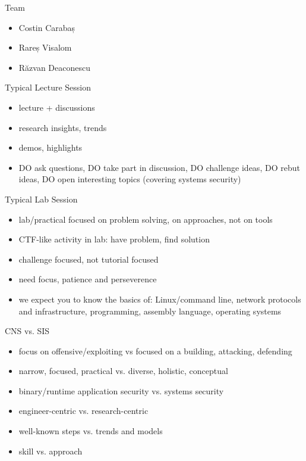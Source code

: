 \documentclass{curs}
\begin{document}
\begin{frame}{Team}
  \begin{itemize}
    \item Costin Carabaș
    \item Rareș Visalom
    \item Răzvan Deaconescu
  \end{itemize}
\end{frame}

\begin{frame}{Typical Lecture Session}
  \begin{itemize}
    \pause \item lecture + discussions
    \pause \item research insights, trends
    \pause \item demos, highlights
    \pause \item DO ask questions, DO take part in discussion, DO challenge ideas, DO rebut ideas, DO open interesting topics (covering systems security)
  \end{itemize}
\end{frame}

\begin{frame}{Typical Lab Session}
  \begin{itemize}
    \pause \item lab/practical focused on problem solving, on approaches, not on tools
    \pause \item CTF-like activity in lab: have problem, find solution
    \pause \item challenge focused, not tutorial focused
    \pause \item need focus, patience and perseverence
    \pause \item we expect you to know the basics of: Linux/command line, network protocols and infrastructure, programming, assembly language, operating systems
  \end{itemize}
\end{frame}

\begin{frame}{CNS vs. SIS}
  \begin{itemize}
    \pause \item focus on offensive/exploiting vs focused on a building, attacking, defending
    \pause \item narrow, focused, practical vs. diverse, holistic, conceptual
    \pause \item binary/runtime application security vs. systems security
    \pause \item engineer-centric vs. research-centric
    \pause \item well-known steps vs. trends and models
    \pause \item skill vs. approach
  \end{itemize}
\end{frame}
\end{document}
